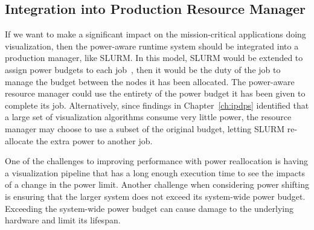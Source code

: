 \subsection{Integration into Production Resource Manager}

If we want to make a significant impact on the mission-critical applications
doing visualization, then the power-aware runtime system should be integrated
into a production manager, like SLURM.
%
In this model, SLURM would be extended to assign power budgets to each
job~\cite{7103433},
then it would be the duty of the job to manage the budget between the nodes it
has been allocated.
%
The power-aware resource manager could use the entirety of the power budget it
has been given to complete its job.
%
Alternatively, since findings in Chapter~\ref{ch:ipdps} identified that a large
set of visualization algorithms consume very little power, the resource manager
may choose to use a subset of the original budget, letting SLURM re-allocate
the extra power to another job.

One of the challenges to improving performance with power reallocation is
having a visualization pipeline that has a long enough execution time to see
the impacts of a change in the power limit.
%
Another challenge when considering power shifting is ensuring that the larger
system does not exceed its system-wide power budget.
%
Exceeding the system-wide power budget can cause damage to the underlying
hardware and limit its lifespan.
